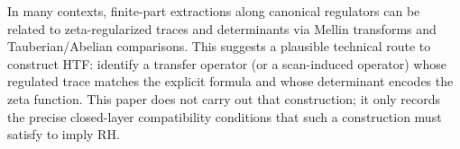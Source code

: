 In many contexts, finite-part extractions along canonical regulators can be related to zeta-regularized traces and determinants via Mellin transforms and Tauberian/Abelian comparisons.
This suggests a plausible technical route to construct HTF: identify a transfer operator (or a scan-induced operator) whose regulated trace matches the explicit formula and whose determinant encodes the zeta function.
This paper does not carry out that construction; it only records the precise closed-layer compatibility conditions that such a construction must satisfy to imply RH.


